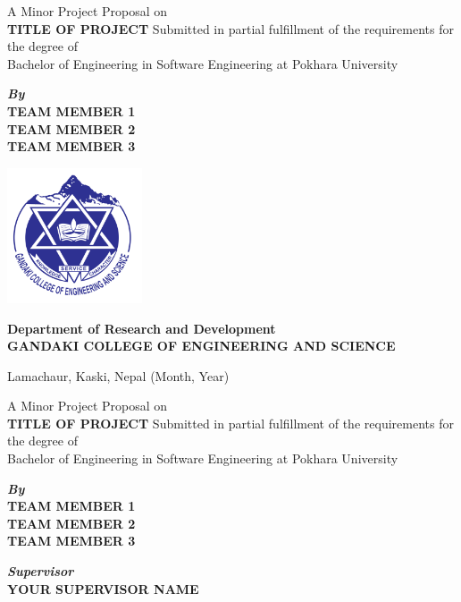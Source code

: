 \begin{titlepage}
		\begin{center}
			A Minor Project Proposal on \\
			\textbf{TITLE OF PROJECT}
			\vskip1cm
			Submitted in partial fulfillment of the requirements for the degree of \\ 
             Bachelor of Engineering in Software Engineering at Pokhara University
			
			\vskip1.5cm
			
			\textbf{\textit{By\\}}
			\textbf{TEAM MEMBER 1 \\ TEAM MEMBER 2 \\ TEAM MEMBER 3}
			
			\vskip2cm
			
			\includegraphics[width=4cm]{gces.png}
			
			\vskip2cm
			
			\textbf{Department of Research and Development \\ GANDAKI COLLEGE OF ENGINEERING AND SCIENCE}
			
			Lamachaur, Kaski, Nepal
			\vskip1cm
			 (Month, Year)
			
			\newpage
			
			A Minor Project Proposal on \\
			\textbf{TITLE OF PROJECT}
			\vskip1cm
			Submitted in partial fulfillment of the requirements for the degree of \\ 
Bachelor of Engineering in Software Engineering at Pokhara University
			
			
			\vskip1.5cm
			
			\textbf{\textit{By\\}}
			\textbf{TEAM MEMBER 1 \\ TEAM MEMBER 2 \\ TEAM MEMBER 3}
			
			\vskip1cm
			
			\textbf{\textit{Supervisor}}
			\textbf{\\ YOUR SUPERVISOR NAME}			
			

\end{center}
\end{titlepage}
